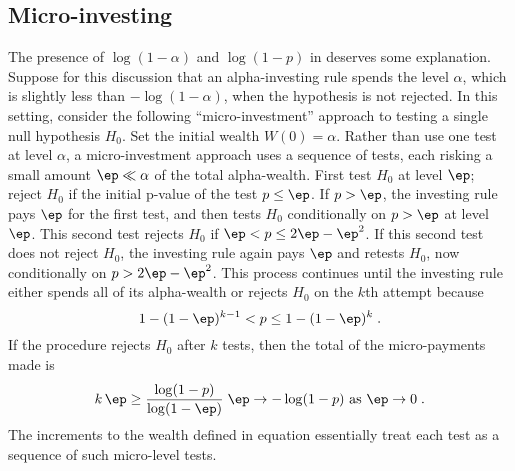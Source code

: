 
\subsection*{Micro-investing}


The presence of $\log (1-\alpha)$ and $\log (1-p)$ in 
 deserves some explanation.  Suppose for this discussion that an alpha-investing rule spends the level $\alpha$, which is slightly less than $-\log(1-\alpha)$, when the hypothesis is not rejected.  In this setting, consider the following
 ``micro-investment'' approach to testing a single null hypothesis
 $H_0$.  Set the initial wealth $W(0) = \alpha$. Rather than use one test at
 level $\alpha$, a micro-investment approach uses a sequence of tests,
 each risking a small amount $\ep \ll \alpha$ of the total
 alpha-wealth.   First test $H_0$ at level $\ep$; reject $H_0$ if the initial p-value of the test $p \le \ep$.  If $p > \ep$, the investing rule pays $\ep$ for the
 first test, and then tests $H_0$ conditionally on $p > \ep$ at
 level $\ep$.  This second test rejects $H_0$ if $\ep < p \le 2\ep -
 \ep^2$.  If this second test does not reject $H_0$, the investing
 rule again pays $\ep$ and retests $H_0$, now conditionally on $p >
 2\ep - \ep^2$.  This process continues until the investing rule
 either spends all of its alpha-wealth or rejects $H_0$ on the $k$th
 attempt because
\begin{displaymath}
  1-(1-\ep)^{k-1} < p \le 1-(1-\ep)^k \;.
\end{displaymath}
If the procedure rejects $H_0$ after $k$ tests, then the total
of the micro-payments made is
\begin{displaymath}
  k \,\ep \ge \frac{\log (1-p)}{\log (1-\ep)}\; \ep
  \rightarrow -\log (1-p) \mbox{ as } \ep \rightarrow 0\;.
\end{displaymath}
The increments to the wealth defined in equation 
essentially treat each test as a sequence of such micro-level tests.
